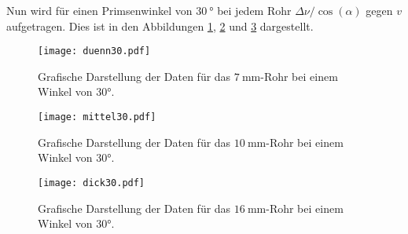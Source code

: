   \begin{table}
    \centering
    \caption{Messdaten und -ergebnisse für das $\SI{16}{\milli\metre}$-Rohr.}
    \label{tab:dick}
    \noindent{}
   \end{table}

Nun wird für einen Primsenwinkel von $\SI{30}{\degree}$ bei jedem Rohr $\Delta\nu/\cos(\alpha)$ gegen $v$ aufgetragen.
Dies ist in den Abbildungen \ref{fig:duenn30}, \ref{fig:mittel30} und \ref{fig:dick30} dargestellt.

\begin{figure}
  \centering
  \texttt{[image: duenn30.pdf]}
  \caption{Grafische Darstellung der Daten für das $\SI{7}{\milli\metre}$-Rohr bei einem Winkel von 30°.}
  \label{fig:duenn30}
\end{figure}

\begin{figure}
  \centering
  \texttt{[image: mittel30.pdf]}
  \caption{Grafische Darstellung der Daten für das $\SI{10}{\milli\metre}$-Rohr bei einem Winkel von 30°.}
  \label{fig:mittel30}
\end{figure}

\begin{figure}
  \centering
  \texttt{[image: dick30.pdf]}
  \caption{Grafische Darstellung der Daten für das $\SI{16}{\milli\metre}$-Rohr bei einem Winkel von 30°.}
  \label{fig:dick30}
\end{figure}

